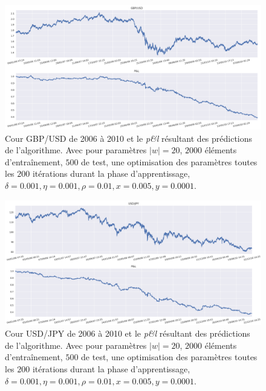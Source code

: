 \documentclass[a4paper, 11pt]{article}
\begin{document}
\begin{figure}
	\centering
	\includegraphics[scale=0.5]{res/gbpusd_2006-2010}
	\caption{Cour GBP/USD de 2006 à 2010  et le \textit{p\&l} résultant des prédictions de l'algorithme. Avec pour paramètres $|w| = 20$, $2000$ éléments d'entraînement, $500$ de test, une optimisation des
		paramètres toutes les $200$ itérations durant la phase d'apprentissage, $\delta = 0.001, \eta=0.001,\rho=0.01, x = 0.005, y=0.0001$.}
\end{figure}

\begin{figure}
	\centering
	\includegraphics[scale=0.5]{res/usdjpy_2006-2010}
	\caption{Cour USD/JPY de 2006 à 2010  et le \textit{p\&l} résultant des prédictions de l'algorithme. Avec pour paramètres $|w| = 20$, $2000$ éléments d'entraînement, $500$ de test, une optimisation des
		paramètres toutes les $200$ itérations durant la phase d'apprentissage, $\delta = 0.001, \eta=0.001,\rho=0.01, x = 0.005, y=0.0001$.}
\end{figure}
\clearpage

\end{document}
